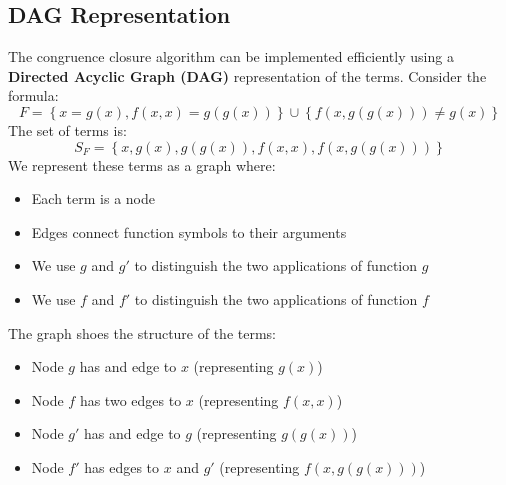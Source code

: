 \documentclass[a4paper]{article}
\theoremstyle{definition}
\begin{document}
\subsection{DAG Representation}
The congruence closure algorithm can be implemented efficiently using a \textbf{Directed Acyclic Graph (DAG)} 
representation of the terms.
\vspace{1em}
\noindent
\newline
Consider the formula:
\[
  F = \left\{ x = g(x), f(x,x) = g(g(x)) \right\} \cup \left\{ f(x,g(g(x))) \neq g(x) \right\} 
\]
The set of terms is:
\[
  S_F = \left\{ x, g(x), g(g(x)), f(x,x), f(x,g(g(x))) \right\}
\]
We represent these terms as a graph where:
\begin{itemize}
	\item Each term is a node 
	\item Edges connect function symbols to their arguments 
	\item We use \( g \) and \( g' \) to distinguish the two applications of function \( g \)  
	\item We use \( f \) and \( f' \) to distinguish the two applications of function \( f \)
\end{itemize}
\begin{center}
\end{center}
The graph shoes the structure of the terms:
\begin{itemize}
	\item Node \( g \) has and edge to \( x \) (representing \( g(x) \))
	\item Node \( f \) has two edges to \( x \) (representing \( f(x,x) \))
	\item Node \( g' \) has and edge to \( g \) (representing \( g(g(x)) \)) 
	\item Node \( f' \) has edges to \( x \) and \( g' \) (representing \( f(x,g(g(x))) \))
\end{itemize}
\end{document}
